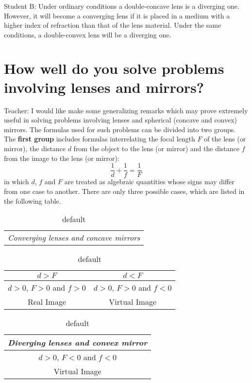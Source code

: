 \documentclass[a4paper,12pt]{book}
\begin{document}
{{\sc Student B:} Under ordinary conditions a double-concave lens is a diverging one. However, it will become a converging lens if it is placed in a medium with a higher index of refraction than that of the lens material. Under the same conditions, a double-convex lens will be a diverging one.




\section{How well do you solve problems involving lenses and mirrors?}
{\sc Teacher:} I would like make some generalizing remarks which may prove extremely useful in solving problems involving lenses and spherical (concave and convex) mirrors.  The formulas used for such problems can be divided into two groups. The {\bf first group} includes formulas interrelating the focal length $F$ of the lens (or mirror), the distance $d$ from the object to the lens (or mirror) and the distance $f$ from the image to the lens (or mirror):
\begin{equation}
\frac{1}{d}+\frac{1}{f} = \frac{1}{F} \label{lensmaker}
\end{equation}
in which $d$, $f$ and $F$ are treated as algebraic quantities whose signs may differ from one case to another. There are only three possible cases, which are listed in the following table.

\begin{table}[htdp]
\caption{default}
\begin{center}
\begin{tabular}{|c|}
\hline
\emph{ Converging lenses and concave mirrors}

\end{tabular}
\begin{tabular}{|c|c|}
\hline
$d > F$ & $d < F$\\
\hline
$d > 0$, $F > 0$ and $f > 0$ & $d>0$, $F>0$ and $f<0$\\
\hline
Real Image & Virtual Image\\
\hline
\end{tabular}
\begin{tabular}{|c|}
\emph{Diverging lenses and convex mirror}\\
\hline
$d > 0$, $F < 0$ and $f < 0$ \\
\hline
Virtual Image\\
\hline
\end{tabular}

\end{center}
\label{default}
\end{table}

}
\end{document}
